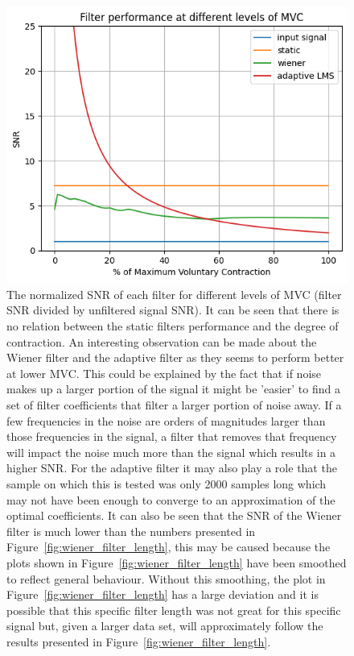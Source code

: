 \begin{figure}[h!t]
	\begin{center}
		\includegraphics[width=0.7\columnwidth]{images/filter_snr_mvc.png}
	\end{center}
	\caption{The normalized SNR of each filter for different levels of MVC (filter SNR divided by unfiltered signal SNR). It can be seen that there is no relation between the static filters performance and the degree of contraction. An interesting observation can be made about the Wiener filter and the adaptive filter as they seems to perform better at lower MVC. This could be explained by the fact that if noise makes up a larger portion of the signal it might be 'easier' to find a set of filter coefficients that filter a larger portion of noise away. If a few frequencies in the noise are orders of magnitudes larger than those frequencies in the signal, a filter that removes that frequency will impact the noise much more than the signal which results in a higher SNR. For the adaptive filter it may also play a role that the sample on which this is tested was only 2000 samples long which may not have been enough to converge to an approximation of the optimal coefficients. It can also be seen that the SNR of the Wiener filter is much lower than the numbers presented in Figure~\ref{fig:wiener_filter_length}, this may be caused because the plots shown in Figure~\ref{fig:wiener_filter_length} have been smoothed to reflect general behaviour. Without this smoothing, the plot in Figure~\ref{fig:wiener_filter_length} has a large deviation and it is possible that this specific filter length was not great for this specific signal but, given a larger data set, will approximately follow the results presented in Figure~\ref{fig:wiener_filter_length}.}
	\label{fig:filter_snr_mvc}
\end{figure}

